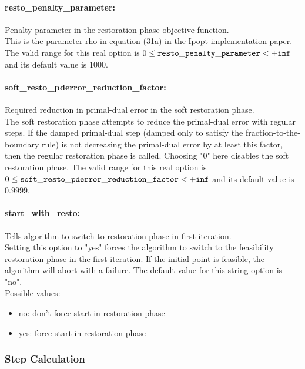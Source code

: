 \paragraph{resto\_penalty\_parameter:}\label{sec:resto_penalty_parameter} 
Penalty parameter in the restoration phase objective function. $\;$ \\
This is the parameter rho in equation (31a) in the Ipopt implementation paper.
The valid range for this real option is
$0 \le {\tt resto\_penalty\_parameter } <  {\tt +inf}$
and its default value is $1000$.


\paragraph{soft\_resto\_pderror\_reduction\_factor:}\label{sec:soft_resto_pderror_reduction_factor} Required reduction in primal-dual error in the soft restoration phase. $\;$ \\
 The soft restoration phase attempts to reduce the
primal-dual error with regular steps. If the
damped primal-dual step (damped only to satisfy
the fraction-to-the-boundary rule) is not
decreasing the primal-dual error by at least this
factor, then the regular restoration phase is
called. Choosing "0" here disables the soft
restoration phase. The valid range for this real option is 
$0 \le {\tt soft\_resto\_pderror\_reduction\_factor } <  {\tt +inf}$
and its default value is $0.9999$.


\paragraph{start\_with\_resto:}\label{sec:start_with_resto} Tells algorithm to switch to restoration phase in first iteration. $\;$ \\
 Setting this option to "yes" forces the algorithm
to switch to the feasibility restoration phase in
the first iteration. If the initial point is
feasible, the algorithm will abort with a failure.
The default value for this string option is "no".
\\ 
Possible values:
\begin{itemize}
   \item no: don't force start in restoration phase
   \item yes: force start in restoration phase
\end{itemize}

\subsubsection{Step Calculation}
\label{sec:Step_Calculation}

